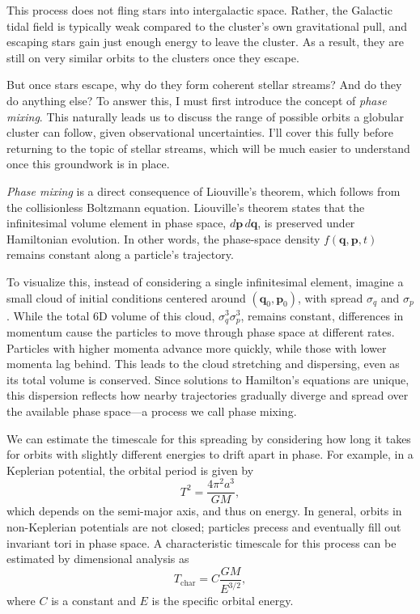         This process does not fling stars into intergalactic space. Rather, the Galactic tidal field is typically weak compared to the cluster's own gravitational pull, and escaping stars gain just enough energy to leave the cluster. As a result, they are still on very similar orbits to the clusters once they escape.

        But once stars escape, why do they form coherent stellar streams? And do they do anything else? To answer this, I must first introduce the concept of \textit{phase mixing}. This naturally leads us to discuss the range of possible orbits a globular cluster can follow, given observational uncertainties. I'll cover this fully before returning to the topic of stellar streams, which will be much easier to understand once this groundwork is in place.
        
        \textit{Phase mixing} is a direct consequence of Liouville's theorem, which follows from the collisionless Boltzmann equation. Liouville's theorem states that the infinitesimal volume element in phase space, \( d\mathbf{p}\,d\mathbf{q} \), is preserved under Hamiltonian evolution. In other words, the phase-space density \( f(\mathbf{q}, \mathbf{p}, t) \) remains constant along a particle's trajectory.

        To visualize this, instead of considering a single infinitesimal element, imagine a small cloud of initial conditions centered around \((\mathbf{q}_0, \mathbf{p}_0)\), with spread \(\sigma_q\) and \(\sigma_p\). While the total 6D volume of this cloud, \(\sigma_q^3 \sigma_p^3\), remains constant, differences in momentum cause the particles to move through phase space at different rates. Particles with higher momenta advance more quickly, while those with lower momenta lag behind. This leads to the cloud stretching and dispersing, even as its total volume is conserved. Since solutions to Hamilton's equations are unique, this dispersion reflects how nearby trajectories gradually diverge and spread over the available phase space—a process we call phase mixing.

        We can estimate the timescale for this spreading by considering how long it takes for orbits with slightly different energies to drift apart in phase. For example, in a Keplerian potential, the orbital period is given by
        \begin{equation}
            T^2 = \frac{4\pi^2 a^3}{GM},
        \end{equation}
        which depends on the semi-major axis, and thus on energy. In general, orbits in non-Keplerian potentials are not closed; particles precess and eventually fill out invariant tori in phase space. A characteristic timescale for this process can be estimated by dimensional analysis as
        \begin{equation}
            T_\mathrm{char} = C \frac{GM}{E^{3/2}},
        \end{equation}
        where \(C\) is a constant and \(E\) is the specific orbital energy.

